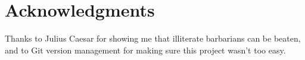 \section*{Acknowledgments} %


Thanks to Julius Caesar for showing me that illiterate barbarians can be beaten, and to Git version management for making sure this project wasn't too easy.
